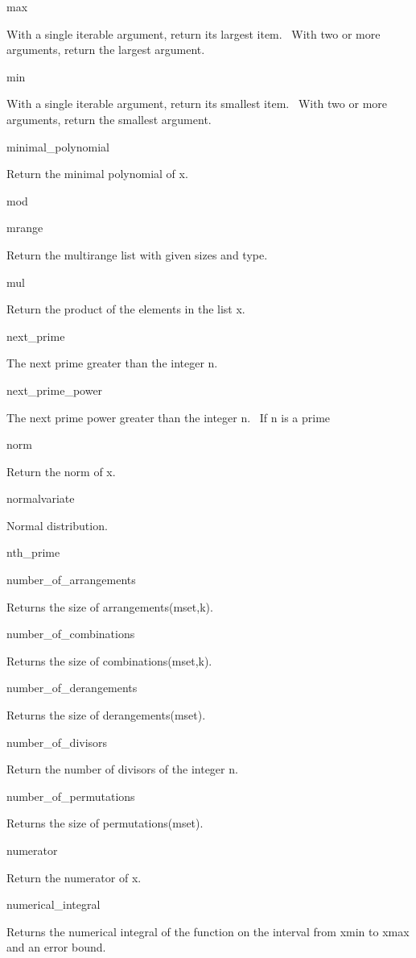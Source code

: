 \documentclass[12pt,twoside]{book}
\begin{document}
max

With a single iterable argument, return its largest item. \ With two or more arguments, return the largest argument.

min

With a single iterable argument, return its smallest item. \ With two or more arguments, return the smallest argument.

minimal\_polynomial

Return the minimal polynomial of x.

mod


\bigskip

mrange

Return the multirange list with given sizes and type.

mul

Return the product of the elements in the list x.

next\_prime

The next prime greater than the integer n.

next\_prime\_power

The next prime power greater than the integer n. \ If n is a prime

norm

Return the norm of x.

normalvariate

Normal distribution.

nth\_prime


\bigskip

number\_of\_arrangements

Returns the size of arrangements(mset,k).

number\_of\_combinations

Returns the size of combinations(mset,k).

number\_of\_derangements

Returns the size of derangements(mset).

number\_of\_divisors

Return the number of divisors of the integer n.

number\_of\_permutations

Returns the size of permutations(mset).

numerator

Return the numerator of x.

numerical\_integral

Returns the numerical integral of the function on the interval from xmin to xmax and an error bound.
\end{document}
